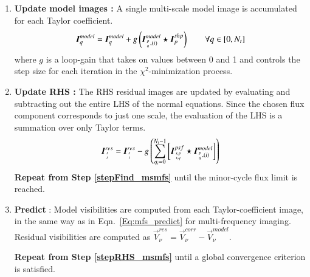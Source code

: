 \documentclass[structabstract]{stylefiles/aa}
\newcommand{\I}{{\vec{I}}}
\begin{document}
\begin{enumerate}
\item\label{stepUpdate_msmfs} {\bf Update model images :}
A single multi-scale model image is accumulated for each Taylor coefficient.
\begin{equation}
\I^{model}_{q} = \I^{model}_{q} + g \left( \I^{model}_{{{p}\atop{q}},(i)} \star \I^{shp}_{p} \right) ~~~~~~~~ \forall q\in[0,N_t]
\label{Eq:msmfs_updatemodel}
\end{equation}
where $g$ is a loop-gain that takes on values between 0 and 1 and controls the 
step size for each iteration in the $\chi^2$-minimization process.

\item\label{stepUpdate_2_msmfs} {\bf Update RHS :}
The RHS residual images are updated by evaluating and subtracting out the entire
LHS of the normal equations. Since the chosen flux component corresponds
to just one scale, the evaluation of the LHS is a summation over only Taylor terms.
\begin{equation}
\I^{res}_{{s}\atop{t}} = \I^{res}_{{s}\atop{t}} - g\left( \sum_{q_i=0}^{N_t-1} \left[  \I^{psf}_{{s,p}\atop{t,q}}  \star \I^{model}_{{{p}\atop{q}},(i)} \right] \right)
\label{Eq:msmfs_updaterhs}
\end{equation}
{\bf Repeat from Step \ref{stepFind_msmfs}} until the minor-cycle flux limit is reached.

\item\label{stepPredict_msmfs} {\bf Predict }:
Model visibilities are computed from each Taylor-coefficient image, 
in the same way as in Eqn.~\ref{Eq:mfs_predict} for multi-frequency imaging.
Residual visibilities are computed as $\vec{V}^{res}_{\nu}= \vec{V}^{corr}_{\nu} - \vec{V}^{model}_{\nu}$.

{\bf Repeat from Step \ref{stepRHS_msmfs}} until a global convergence criterion is satisfied.
\end{enumerate}
\enlargethispage{\baselineskip}
\end{document}
